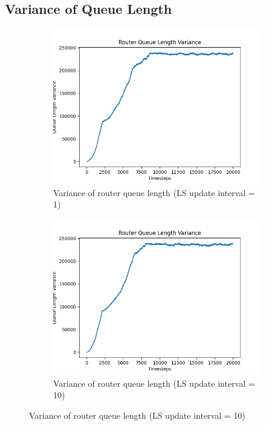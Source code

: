 \subsection{Variance of Queue Length}
    \begin{figure}[H]
        \centering
        \begin{subfigure}[b]{0.475\textwidth}
            \centering
            \includegraphics[width=\textwidth]{figs/appendix/variance_ls=1.png}
            \caption[]{Variance of router queue length (LS update interval = 1)}
            \label{fig:qvar-1}
        \end{subfigure}
        \hfill
        \begin{subfigure}[b]{0.475\textwidth}
            \centering
            \includegraphics[width=\textwidth]{figs/appendix/variance_ls=10.png}
            \caption[]{Variance of router queue length (LS update interval = 10)}
            \label{fig:qvar-10}
        \end{subfigure}
    \end{figure}
